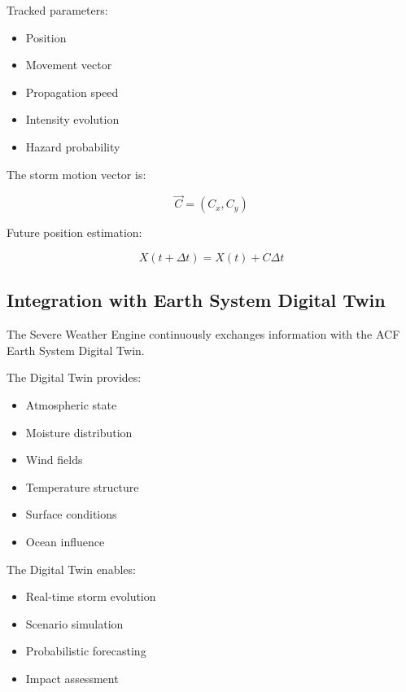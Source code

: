 Tracked parameters:

\begin{itemize}

\item Position

\item Movement vector

\item Propagation speed

\item Intensity evolution

\item Hazard probability

\end{itemize}


The storm motion vector is:

\[
\vec{C}
=
(C_x,C_y)
\]


Future position estimation:

\[
X(t+\Delta t)
=
X(t)+C\Delta t
\]



\subsection{Integration with Earth System Digital Twin}

The Severe Weather Engine continuously exchanges information with the
ACF Earth System Digital Twin.

The Digital Twin provides:

\begin{itemize}

\item Atmospheric state

\item Moisture distribution

\item Wind fields

\item Temperature structure

\item Surface conditions

\item Ocean influence

\end{itemize}


The Digital Twin enables:

\begin{itemize}

\item Real-time storm evolution

\item Scenario simulation

\item Probabilistic forecasting

\item Impact assessment

\end{itemize}


